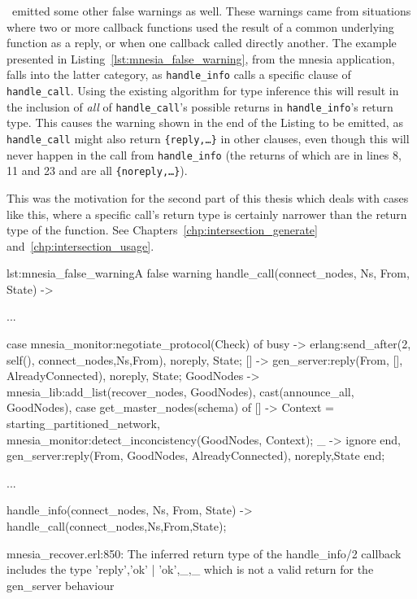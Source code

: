 \dr\ emitted some other false warnings as well. These warnings came
from situations where two or more callback functions used the result
of a common underlying function as a reply, or when one callback
called directly another. The example presented in
Listing~\ref{lst:mnesia_false_warning}, from the mnesia application,
falls into the latter category, as \texttt{handle\_info} calls a
specific clause of \texttt{handle\_call}. Using the existing algorithm
for type inference this will result in the inclusion of \emph{all} of
\texttt{handle\_call}'s possible returns in \texttt{handle\_info}'s
return type. This causes the warning shown in the end of the Listing
to be emitted, as \texttt{handle\_call} might also return
\texttt{\{reply,\ldots\}} in other clauses, even though this will
never happen in the call from \texttt{handle\_info} (the returns of
which are in lines 8, 11 and 23 and are all
\texttt{\{noreply,\ldots\}}).

This was the motivation for the second part of this thesis which deals
with cases like this, where a specific call's return type is certainly
narrower than the return type of the function. See
Chapters~\ref{chp:intersection_generate}
and~\ref{chp:intersection_usage}.

\begin{code}{lst:mnesia_false_warning}{A false warning}
handle_call({connect_nodes, Ns}, From, State) ->
    
    ...

    case mnesia_monitor:negotiate_protocol(Check) of
	busy -> 
	    erlang:send_after(2, self(), {connect_nodes,Ns,From}),
	    {noreply, State};
	[] ->
	    gen_server:reply(From, {[], AlreadyConnected}),
	    {noreply, State};
	GoodNodes ->
	    mnesia_lib:add_list(recover_nodes, GoodNodes),
	    cast({announce_all, GoodNodes}),
	    case get_master_nodes(schema) of 
		[] ->
		    Context = starting_partitioned_network,
		    mnesia_monitor:detect_inconcistency(GoodNodes, Context);
		_ -> %
		    ignore
	    end,
	    gen_server:reply(From, {GoodNodes, AlreadyConnected}),
	    {noreply,State}
    end;

...

handle_info({connect_nodes, Ns, From}, State) ->
    handle_call({connect_nodes,Ns},From,State);


mnesia_recover.erl:850: The inferred return type of the handle_info/2
callback includes the type {'reply','ok' | {'ok',_},_} which is not a
valid return for the gen_server behaviour

\end{code}


